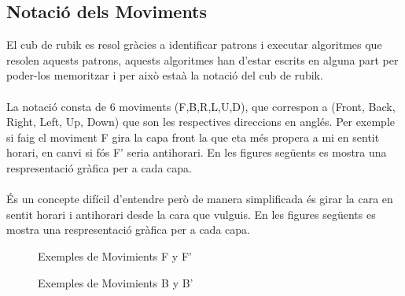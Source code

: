 \subsection{Notació dels Moviments}

El cub de rubik es resol gràcies a identificar patrons i executar algoritmes que resolen aquests patrons, aquests algoritmes han d'estar escrits en alguna part per poder-los memoritzar i per això estaà la notació del cub de rubik.
\\\\La notació consta de 6 moviments (F,B,R,L,U,D), que correspon a (Front, Back, Right, Left, Up, Down) que son les respectives direccions en anglés. Per exemple si faig el moviment F gira la capa front la que eta més propera a mi en sentit horari, en canvi si fós F' seria antihorari. En les figures següents es mostra una respresentació gràfica per a cada capa.
\\\\És un concepte difícil d'entendre però de manera simplificada és girar la cara en sentit horari i antihorari desde la cara que vulguis. En les figures següents es mostra una respresentació gràfica per a cada capa.

\begin{figure}[htbp]
    \centering
    \begin{subfigure}
        \centering\RubikCubeSolvedWY
    \end{subfigure}
    \begin{subfigure}
        \centering\RubikCubeSolvedWY
    \end{subfigure}
    \caption{Exemples de Movimients F y F'}
\end{figure}

\begin{figure}[htbp]
    \centering
    \begin{subfigure}
        \centering\RubikCubeSolvedWY
    \end{subfigure}
    \begin{subfigure}
        \centering\RubikCubeSolvedWY
    \end{subfigure}
    \caption{Exemples de Movimients B y B'}
\end{figure}

